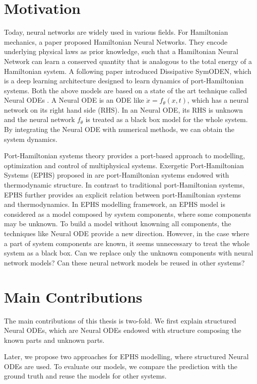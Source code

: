\documentclass[
	parskip, 			   %
	twoside, 			   %
	DIV=14, 			   %
	BCOR=15.0mm, 		   %
	headsepline, 		   %
	open=right, 		   %
	captions=tableheading, %
	bibliography=totoc,    %
	numbers=noenddot       %
]{scrreprt}
\begin{document}
\section{Motivation}
Today, neural networks are widely used in various fields. For Hamiltonian mechanics, a paper \cite{greydanus2019hamiltonian} proposed Hamiltonian Neural Networks. They encode underlying physical laws as prior knowledge, such that a Hamiltonian Neural Network can learn a conserved quantity that is analogous to the total energy of a Hamiltonian system. A following paper \cite{zhong2020dissipative} introduced Dissipative SymODEN, which is a deep learning architecture designed to learn dynamics of port-Hamiltonian systems. Both the above models are based on a state of the art technique called Neural ODEs \cite{chen2018neural}. A Neural ODE is an ODE like $\dot{x} = f_{\theta}(x, t)$, which has a neural network on its right hand side (RHS). In an Neural ODE, its RHS is unknown and the neural network $f_{\theta}$ is treated as a black box model for the whole system. By integrating the Neural ODE with numerical methods, we can obtain the system dynamics.

Port-Hamiltonian systems theory provides a port-based approach to modelling, optimization and control of multiphysical systems. Exergetic Port-Hamiltonian Systems (EPHS) proposed in \cite{lohmayer2021exergetic} are port-Hamiltonian systems endowed with thermodynamic structure. In contrast to traditional port-Hamiltonian systems, EPHS further provides an explicit relation between port-Hamiltonian systems and thermodynamics. In EPHS modelling framework, an EPHS model is considered as a model composed by system components, where some components may be unknown. To build a model without knowning all components, the techniques like Neural ODE provide a new direction. However, in the case where a part of system components are known, it seems unnecessary to treat the whole system as a black box. Can we replace only the unknown components with neural network models? Can these neural network models be reused in other systems?

\section{Main Contributions}
The main contributions of this thesis is two-fold. We first explain structured Neural ODEs, which are Neural ODEs endowed with structure composing the known parts and unknown parts. 

Later, we propose two approaches for EPHS modelling, where structured Neural ODEs are used. To evaluate our models, we compare the prediction with the ground truth and reuse the models for other systems.
\end{document}
